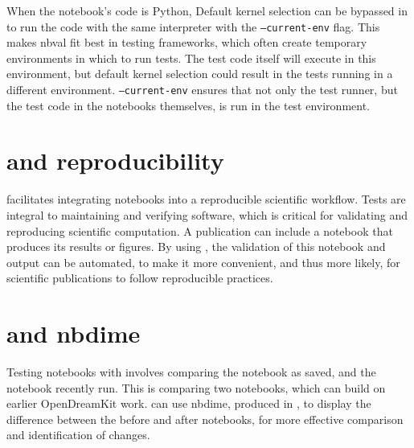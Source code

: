 \documentclass{deliverablereport}
\begin{document}
When the notebook's code is Python,
Default kernel selection can be bypassed in \nbval to run the code with the same interpreter
with the \texttt{--current-env} flag.
This makes nbval fit best in testing frameworks,
which often create temporary environments in which to run tests.
The test code itself will execute in this environment,
but default kernel selection could result in the tests running in a different environment.
\texttt{--current-env} ensures that not only the test runner,
but the test code in the notebooks themselves,
is run in the test environment.


\section{\nbval and reproducibility} %

\nbval facilitates integrating notebooks into a reproducible
scientific workflow.  Tests are integral to maintaining and verifying
software, which is critical for validating and reproducing scientific
computation.  A publication can include a notebook that produces its
results or figures.  By using \nbval, the validation of this notebook
and output can be automated, to make it more convenient, and thus more
likely, for scientific publications to follow reproducible practices.


\section{\nbval and nbdime} %

Testing notebooks with \nbval involves comparing the notebook as saved,
and the notebook recently run.
This is comparing two notebooks,
which can build on earlier OpenDreamKit work.
\nbval can use nbdime, produced in ,
to display the difference between the before and after notebooks,
for more effective comparison and identification of changes.
\end{document}
